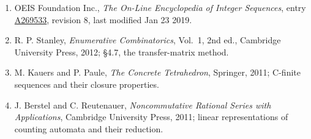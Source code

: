 \documentclass[11pt]{article}
\theoremstyle{definition}
\begin{document}
\begin{enumerate}

\item OEIS Foundation Inc., \emph{The On-Line Encyclopedia of Integer Sequences}, entry \href{https://oeis.org/A269533}{A269533}, revision 8, last modified Jan 23 2019.

\item R. P. Stanley, \emph{Enumerative Combinatorics}, Vol.~1, 2nd ed., Cambridge University Press, 2012; \S4.7, the transfer-matrix method.

\item M. Kauers and P. Paule, \emph{The Concrete Tetrahedron}, Springer, 2011; C-finite sequences and their closure properties.

\item J. Berstel and C. Reutenauer, \emph{Noncommutative Rational Series with Applications}, Cambridge University Press, 2011; linear representations of counting automata and their reduction.

\end{enumerate}
\end{document}
